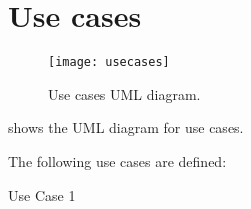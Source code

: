 \chapter{Use cases}\label{ch:usecases}

\begin{figure}[p]
	\texttt{[image: usecases]}
	\caption{Use cases UML diagram.}
	\label{fig:usecases}
\end{figure}

 shows the UML diagram for use cases.

The following use cases are defined:
\begin{description}
	\item[Use Case 1] \textellipsis
\end{description}
